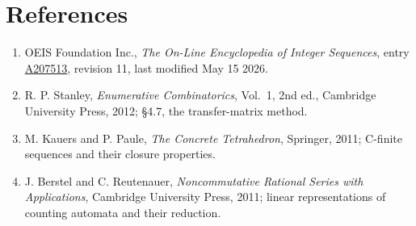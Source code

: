 \documentclass[11pt]{article}
\theoremstyle{definition}
\begin{document}
\section{References}

\begin{enumerate}

\item OEIS Foundation Inc., \emph{The On-Line Encyclopedia of Integer Sequences}, entry \href{https://oeis.org/A207513}{A207513}, revision 11, last modified May 15 2026.

\item R. P. Stanley, \emph{Enumerative Combinatorics}, Vol.~1, 2nd ed., Cambridge University Press, 2012; \S4.7, the transfer-matrix method.

\item M. Kauers and P. Paule, \emph{The Concrete Tetrahedron}, Springer, 2011; C-finite sequences and their closure properties.

\item J. Berstel and C. Reutenauer, \emph{Noncommutative Rational Series with Applications}, Cambridge University Press, 2011; linear representations of counting automata and their reduction.

\end{enumerate}
\end{document}
